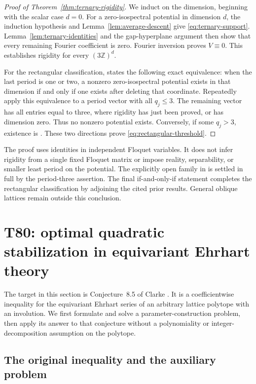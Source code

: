 \documentclass[11pt,a4paper]{article}
\theoremstyle{definition}
\theoremstyle{remark}\newtheorem{remark}[lemma]{Remark}
\newcommand{\Z}{\mathbb Z}\newcommand{\Q}{\mathbb Q}
\begin{document}
\begin{proof}[Proof of Theorem~\ref{thm:ternary-rigidity}]
We induct on the dimension, beginning with the scalar case $d=0$.
For a zero-isospectral potential in dimension $d$, the induction hypothesis
and Lemma~\ref{lem:average-descent} give
\eqref{eq:ternary-support}. Lemma~\ref{lem:ternary-identities} and the
gap-hyperplane argument then show that every remaining Fourier coefficient
is zero. Fourier inversion proves $V\equiv0$. This establishes rigidity
for every $(3\Z)^d$.

For the rectangular classification, \cite[Proposition~4.2]{CFK} states
the following exact equivalence: when the last period is one or two, a
nonzero zero-isospectral potential exists in that dimension if and only
if one exists after deleting that coordinate. Repeatedly apply this
equivalence to a period vector with all $q_j\leq3$. The remaining vector
has all entries equal to three, where rigidity has just been proved, or
has dimension zero. Thus no nonzero potential exists.
Conversely, if some $q_j>3$, existence is
\cite[Theorem~C]{CFK}. These two directions prove
\eqref{eq:rectangular-threshold}.
\end{proof}

The proof uses identities in independent Floquet variables. It does not
infer rigidity from a single fixed Floquet matrix or impose reality,
separability, or smaller least period on the potential. The explicitly
open family in \cite[Section~4.4]{CFK} is settled in full by the
period-three assertion. The final if-and-only-if statement completes the
rectangular classification by adjoining the cited prior results. General
oblique lattices remain outside this conclusion.

\section{T80: optimal quadratic stabilization in equivariant Ehrhart theory}
\label{sec:ehrhart-stabilization}

The target in this section is Conjecture~8.5 of Clarke
\cite{Clarke26}. It is a coefficientwise inequality for the equivariant
Ehrhart series of an arbitrary lattice polytope with an involution. We first
formulate and solve a parameter-construction problem, then apply its answer
to that conjecture without a polynomiality or integer-decomposition
assumption on the polytope.

\subsection{The original inequality and the auxiliary problem}
\end{document}
